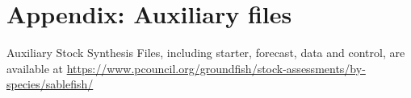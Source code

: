 \documentclass[11pt,
  english,
  a4paper,
]{article}
\begin{document}
\tagmcend\tagstructend

\clearpage

\clearpage


\hypertarget{appendix-auxiliary-files}{%
\section{Appendix: Auxiliary files}\label{appendix-auxiliary-files}}

\leavevmode\tagmcend\tagstructend


Auxiliary Stock Synthesis Files, including starter, forecast, data and control, are available at {\url{https://www.pcouncil.org/groundfish/stock-assessments/by-species/sablefish/}\leavevmode\tagmcend\tagstructend}

\leavevmode\tagmcend\tagstructend\par
\end{document}
